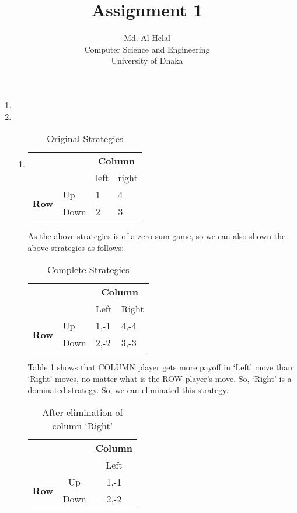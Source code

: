 \documentclass[a4paper,12pt]{article}
\author{Md. Al-Helal\\Computer Science and Engineering\\University of Dhaka}
\title{Assignment 1}
\begin{document}
\maketitle
\begin{enumerate}
\item
\item
\begin{enumerate}
\item
\begin{table}[H]
\centering
\begin{tabular}{@{}llll@{}}
\toprule
& & \multicolumn{2}{c}{\bfseries Column}\\
& & left & right\\
\multirow{2}{*}{\bfseries Row} & Up & 1 & 4\\
 & Down & 2 & 3\\
\bottomrule
\end{tabular}
\caption{Original Strategies}
\end{table}

As the above strategies is of a zero-sum game, so we can also shown the above strategies as follows:

\begin{table}[H]
\centering
\begin{tabular}{@{}llll@{}}
\toprule
& & \multicolumn{2}{c}{\bfseries Column}\\
& & Left & Right\\
\multirow{2}{*}{\bfseries Row} & Up & 1,-1 & 4,-4\\
 & Down & 2,-2 & 3,-3\\
\bottomrule
\end{tabular}
\caption{Complete Strategies}
\label{tab:completea}
\end{table}

Table \ref{tab:completea} shows that COLUMN player gets more payoff in `Left' move than `Right' moves, no matter what is the ROW player's move. So, `Right' is a dominated strategy. So, we can eliminated this strategy.

\begin{table}[H]
\centering
\begin{tabular}{@{}ccc@{}}
\toprule
& & \multicolumn{1}{c}{\bfseries Column}\\
& & Left\\
\multirow{2}{*}{\bfseries Row} & Up & 1,-1\\
 & Down & 2,-2\\
\bottomrule
\end{tabular}
\caption{After elimination of column `Right'}
\end{table}


\end{enumerate}
\end{enumerate}
\end{document}
